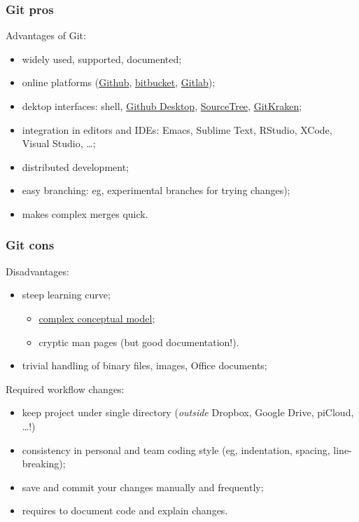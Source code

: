 \documentclass[10pt,svgnames]{beamer}
\begin{document}
\begin{frame}
\frametitle{Git pros}

Advantages of Git:
\begin{itemize}
  \item widely used, supported, documented;
  \item online platforms (\href{https://github.com/}{Github}, \href{https://bitbucket.org/}{bitbucket}, \href{https://about.gitlab.com/}{Gitlab});
  \item dektop interfaces: shell, \href{https://desktop.github.com/}{Github Desktop}, \href{https://www.sourcetreeapp.com/}{SourceTree}, \href{https://www.gitkraken.com/}{GitKraken};
  \item integration in editors and IDEs: Emacs, Sublime Text, RStudio, XCode, Visual Studio, \ldots;
  \item distributed development;
  \item easy branching: eg, experimental branches for trying changes);
  \item makes complex merges quick.
\end{itemize}
\end{frame}


\begin{frame}
\frametitle{Git cons}
\label{git_cons}

Disadvantages:
\begin{itemize}
  \item steep learning curve;
  \begin{itemize}
      \item \hyperlink{xkcd_git}{complex conceptual model};
      \item cryptic man pages (but good documentation!).
  \end{itemize}  
  \item trivial handling of binary files, images, Office documents;
\end{itemize}

Required workflow changes:
\begin{itemize}
  \item keep project under single directory (\emph{outside} Dropbox, Google Drive, piCloud, \ldots!)
  \item consistency in personal and team coding style (eg, indentation, spacing, line-breaking);
  \item save and commit your changes manually and frequently;
  \item requires to document code and explain changes.
\end{itemize}
\end{frame}
\end{document}
